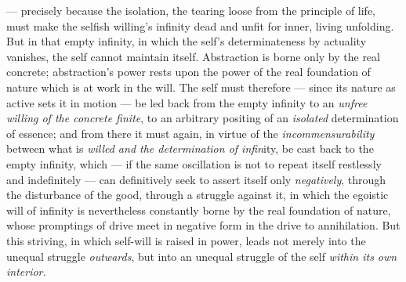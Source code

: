 \documentclass[12pt,a4paper]{book}
\begin{document}
--- precisely because the isolation, the tearing loose from the principle of
life, must make the selfish willing's infinity dead and unfit for inner, living
unfolding. But in that empty infinity, in which the self's determinateness by
actuality vanishes, the self cannot maintain itself. Abstraction is borne only
by the real concrete; abstraction's power rests upon the power of the real
foundation of nature which is at work in the will. The self must therefore ---
since its nature as active sets it in motion --- be led back from the empty
infinity to an \emph{unfree willing of the concrete finite}, to an arbitrary
positing of an \emph{isolated} determination of essence; and from there it must
again, in virtue of the \emph{incommensurability} between what is \emph{willed
and the determination of infin}ity, be cast back to the empty infinity, which
--- if the same oscillation is not to repeat itself restlessly and indefinitely
--- can definitively seek to assert itself only \emph{negatively}, through the
disturbance of the good, through a struggle against it, in which the egoistic
will of infinity is nevertheless constantly borne by the real foundation of
nature, whose promptings of drive meet in negative form in the drive to
annihilation. But this striving, in which self-will is raised in power, leads
not merely into the unequal struggle \emph{outwards}, but into an unequal
struggle of the self \emph{within its own interior.}
\end{document}
